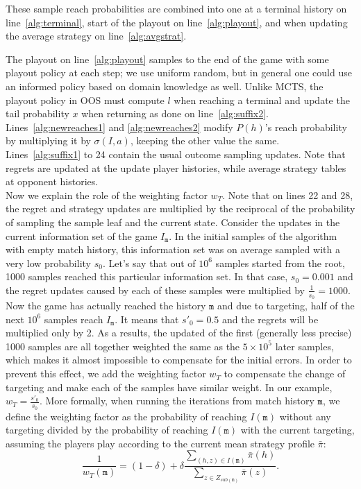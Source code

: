 \documentclass{aamas2015}
\newcommand{\ttm}{\mathtt{m}}
\begin{document}
These sample reach probabilities are combined into one at a terminal history on line~\ref{alg:terminal}, 
start of the playout on line~\ref{alg:playout}, and when updating the average 
strategy on line~\ref{alg:avgstrat}. 

The playout on line~\ref{alg:playout} samples to the end of the game with some playout policy at each step; we use uniform random, 
but in general one could use an informed policy based on domain knowledge as well. 
Unlike MCTS, the playout policy in OOS must compute $l$ when reaching a terminal and update the tail probability $x$ when returning
as done on line~\ref{alg:suffix2}. Lines~\ref{alg:newreaches1} and \ref{alg:newreaches2} modify $P(h)$'s reach probability 
by multiplying it by $\sigma(I,a)$, keeping the other value the same.
Lines~\ref{alg:suffix1} to 24
contain the usual outcome sampling updates. Note that regrets are updated at the 
update player histories, while average strategy tables at opponent histories. \\


Now we explain the role of the weighting factor $w_T$. Note that on lines 22 and 28, the regret and strategy updates are multiplied by the reciprocal of the probability of sampling the sample leaf and the current state. 
Consider the updates in the current information set of the game $I_\ttm$. In the initial samples of the algorithm with empty match history, this information set was on average sampled with a very low probability $s_0$. Let's say that out of $10^6$ samples started from the root, 1000 samples reached this particular information set. In that case, $s_0=0.001$ and the regret updates caused by each of these samples were multiplied by $\frac{1}{s_0}=1000$.
Now the game has actually reached the history $\ttm$ and due to targeting, half of the next $10^6$ samples reach $I_\ttm$. It means that  $s'_0=0.5$ and the regrets will be multiplied only by 2.
As a results, the updated of the first (generally less precise) 1000 samples are all together weighted the same as the $5\times 10^5$ later samples, which makes it almost impossible to compensate for the initial errors.
In order to prevent this effect, we add the weighting factor $w_T$ to compensate the change of targeting and make each of the samples have similar weight. 
In our example, $w_T=\frac{s'_0}{s_0}$. More formally, when running the iterations from match history $\ttm$, we define the weighting factor as the probability of reaching $I(\ttm)$ without any targeting divided by the probability of reaching $I(\ttm)$ with the current targeting, assuming the players play according to the current mean strategy profile $\bar{\pi}$:
\[\frac{1}{w_T(\ttm)} =  (1-\delta) + \delta\frac{\sum_{(h,z)\in I(\ttm)} \bar{\pi}(h)}{\sum_{z\in Z_{sub(\ttm)}} \bar{\pi}(z)}.\]
\end{document}
